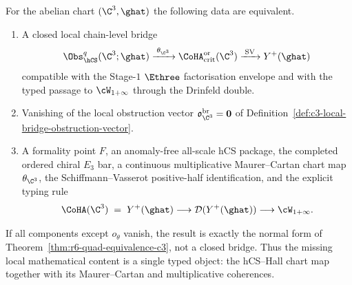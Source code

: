 \begin{theorem}
\label{thm:c3-local-bridge-closure-criterion}
For the abelian chart $(\C^3,\ghat)$ the following data are equivalent.
\begin{enumerate}
\item A closed local chain-level bridge
\[
 \Obs_{\hCS}^{q}(\C^3;\ghat)
 \xrightarrow{\;\theta_{\C^3}\;}
 \CoHA_{\mathrm{crit}}^{\mathrm{or}}(\C^3)
 \xrightarrow{\;\mathrm{SV}\;}
 Y^+(\ghat)
\]
compatible with the Stage-$1$ $\Ethree$ factorisation envelope and with
the typed passage to $\cW_{1+\infty}$ through the Drinfeld double.
\item Vanishing of the local obstruction vector
$\mathfrak o_{\C^3}^{\mathrm{br}}=\mathbf 0$ of
Definition~\ref{def:c3-local-bridge-obstruction-vector}.
\item A formality point $F$, an anomaly-free all-scale hCS package, the
completed ordered chiral $E_3$ bar, a continuous multiplicative
Maurer--Cartan chart map $\theta_{\C^3}$, the
Schiffmann--Vasserot positive-half identification, and the explicit
typing rule
\[
 \CoHA(\C^3)\;=\;Y^+(\ghat)
 \longrightarrow
 \mathcal D(Y^+(\ghat))
 \longrightarrow
 \cW_{1+\infty}.
\]
\end{enumerate}
If all components except $o_{\theta}$ vanish, the result is exactly the
normal form of Theorem~\ref{thm:r6-quad-equivalence-c3}, not a closed
bridge. Thus the missing local mathematical content is a single typed
object: the hCS--Hall chart map together with its Maurer--Cartan and
multiplicative coherences.
\end{theorem}

